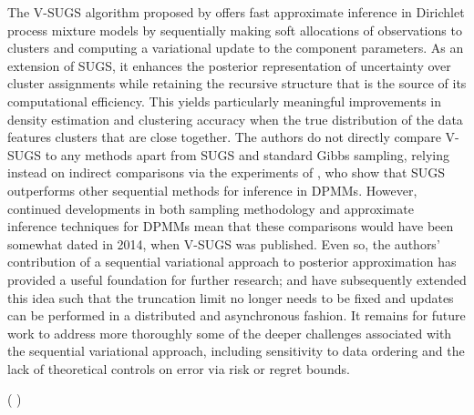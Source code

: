 \documentclass{uwstat572}
\newcommand{\vmcomment}[1]{({\color{blue}{VM's comment:}} \textbf{\color{blue}{#1}})}
\begin{document}
The V-SUGS algorithm proposed by \cite{zhang} offers fast approximate inference in Dirichlet process mixture models by sequentially making soft allocations of observations to clusters and computing a variational update to the component parameters. As an extension of SUGS, it enhances the posterior representation of uncertainty over cluster assignments while retaining the recursive structure that is the source of its computational efficiency. This yields particularly meaningful improvements in density estimation and clustering accuracy when the true distribution of the data features clusters that are close together. The authors do not directly compare V-SUGS to any methods apart from SUGS and standard Gibbs sampling, relying instead on indirect comparisons via the experiments of \cite{wang}, who show that SUGS outperforms other sequential methods for inference in DPMMs. However, continued developments in both sampling methodology and approximate inference techniques for DPMMs mean that these comparisons would have been somewhat dated in 2014, when V-SUGS was published. Even so, the authors' contribution of a sequential variational approach to posterior approximation has provided a useful foundation for further research; \cite{lin} and \cite{campbell} have subsequently extended this idea such that the truncation limit no longer needs to be fixed and updates can be performed in a distributed and asynchronous fashion. It remains for future work to address more thoroughly some of the deeper challenges associated with the sequential variational approach, including sensitivity to data ordering and the lack of theoretical controls on error via risk or regret bounds. 

\newpage

\vmcomment{Protect capitalization in the titles. Journal names should have the first letter of each word capitalized.}


\end{document}
